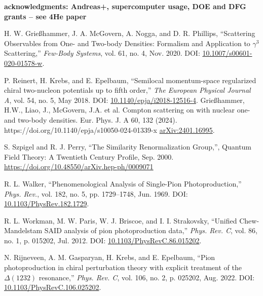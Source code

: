 \documentclass[a4paper,11pt]{article}
\newcommand{\com}[1]{\color{blue}\small\textbf{ #1 }\color{black}\normalsize}
\begin{document}
\com{acknowledgments: Andreas+, supercomputer usage, DOE and DFG grants -- see 4He paper}
\begin{thebibliography}{99}
  H. W. Grie{\ss}hammer, J. A. McGovern, A. Nogga, and D. R.
  Phillips, ``Scattering Observables from One- and Two-body
  Densities: Formalism and Application to $\gamma^3$ Scattering,''
  \textit{Few-Body Systems}, vol. 61, no. 4, Nov. 2020. DOI:
  \href{https://doi.org/10.1007/s00601-020-01578-w}{10.1007/s00601-020-01578-w}.

  P. Reinert, H. Krebs, and E. Epelbaum, ``Semilocal momentum-space
  regularized chiral two-nucleon potentials up to fifth order,''
  \textit{The European Physical Journal A}, vol. 54, no. 5, May 2018.
  DOI:
  \href{http://dx.doi.org/10.1140/epja/i2018-12516-4}{10.1140/epja/i2018-12516-4}.
Grießhammer, H.W., Liao, J., McGovern, J.A. et al. Compton scattering on 
 with nuclear one- and two-body densities. Eur. Phys. J. A 60, 132 (2024). https://doi.org/10.1140/epja/s10050-024-01339-x
\href{https://arxiv.org/abs/2401.16995}{arXiv:2401.16995}.

S. Szpigel and R. J. Perry, ``The Similarity Renormalization Group,'', Quantum Field Theory: A Twentieth Century Profile,
Sep. 2000. \href{https://doi.org/10.48550/arXiv.hep-ph/0009071}{https://doi.org/10.48550/arXiv.hep-ph/0009071}
  
  R. L. Walker, ``Phenomenological Analysis of Single-Pion
  Photoproduction,'' \textit{Phys. Rev.}, vol. 182, no. 5, pp.
  1729--1748, Jun. 1969. DOI:
  \href{https://link.aps.org/doi/10.1103/PhysRev.182.1729}{10.1103/PhysRev.182.1729}.

  R. L. Workman, M. W. Paris, W. J. Briscoe, and I. I. Strakovsky,
  ``Unified Chew-Mandelstam SAID analysis of pion photoproduction
  data,'' \textit{Phys. Rev. C}, vol. 86, no. 1, p. 015202, Jul.
  2012. DOI:
  \href{https://link.aps.org/doi/10.1103/PhysRevC.86.015202}{10.1103/PhysRevC.86.015202}.

N. Rijneveen, A. M. Gasparyan, H. Krebs, and E. Epelbaum, ``Pion photoproduction in chiral perturbation theory with explicit treatment of the $\Delta(1232)$ resonance,'' \textit{Phys. Rev. C}, vol. 106, no. 2, p. 025202, Aug. 2022. DOI: \href{https://link.aps.org/doi/10.1103/PhysRevC.106.025202}{10.1103/PhysRevC.106.025202}.


\end{thebibliography}
\end{document}
